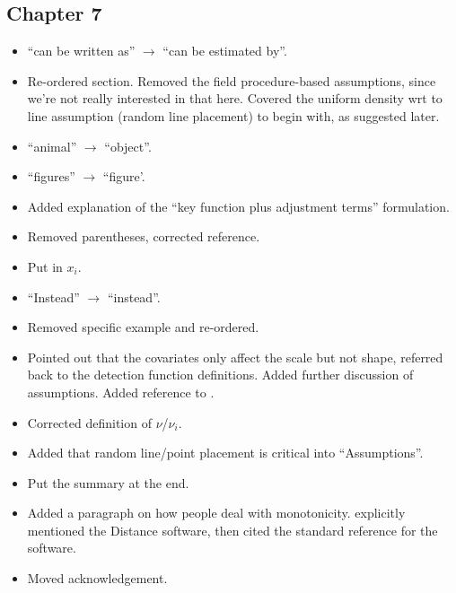\subsection{Chapter 7}
\begin{itemize}
\item {} ``can be written as'' $\rightarrow$ ``can be estimated by''.
\item {} Re-ordered section. Removed the field procedure-based assumptions, since we're not really interested in that here. Covered the uniform density wrt to line assumption (random line placement) to begin with, as suggested later.
\item {} ``animal'' $\rightarrow$ ``object''.
\item {} ``figures'' $\rightarrow$ ``figure'.
\item {} Added explanation of the ``key function plus adjustment terms'' formulation.
\item {} Removed parentheses, corrected reference.
\item {} Put in $x_i$.
\item {} ``Instead'' $\rightarrow$ ``instead''.
\item {} Removed specific example and re-ordered.
\item {} Pointed out that the covariates only affect the scale but not shape, referred back to the detection function definitions. Added further discussion of assumptions.  Added reference to .
\item {} Corrected definition of $\nu$/$\nu_i$.
\item {} Added that random line/point placement is critical into ``Assumptions''.
\item {} Put the summary at the end.
\item {} Added a paragraph on how people deal with monotonicity.  explicitly mentioned the Distance software, then cited the standard reference for the software.
\item {} Moved acknowledgement.
\end{itemize}

